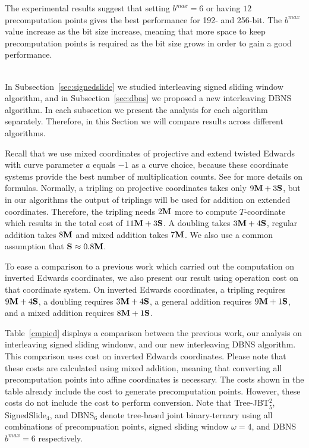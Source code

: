 The experimental results suggest that setting $b^{max} = 6$ or having $12$ precomputation points gives the best performance for 192- and 256-bit.
The $b^{max}$ value increase as the bit size increase, meaning that more space to keep precomputation points is required as the bit size grows
in order to gain a good performance.



 \\

In Subsection~\ref{sec:signedslide} we studied interleaving signed sliding window algorithm,
and in Subsection~\ref{sec:dbns} we proposed a new interleaving DBNS algorithm.
In each subsection we present the analysis for each algorithm separately.
Therefore, in this Section we will compare results across different algorithms.

Recall that we use mixed coordinates of projective and extend twisted Edwards with curve parameter $a$ equals $-1$ as a curve choice,
because these coordinate systems provide the best number of multiplication counts.
See \cite{EFD} for more details on formulas.
Normally, a tripling on projective coordinates takes only $9\text{\bf M} + 3\text{\bf S}$,
but in our algorithms the output of triplings will be used for addition on extended coordinates.
Therefore, the tripling needs $2\text{\bf M}$ more to compute $T$-coordinate which results in the total cost of $11\text{\bf M} + 3\text{\bf S}$.
A doubling takes $3\text{\bf M} + 4\text{\bf S}$, regular addition takes $8\text{\bf M}$ and mixed addition takes $7\text{\bf M}$.
We also use a common assumption that $\text{\bf S} \approx 0.8\text{\bf M}$.

To ease a comparison to a previous work \cite{DKS09} which carried out the computation on inverted Edwards coordinates,
we also present our result using operation cost on that coordinate system.
On inverted Edwards coordinates, a tripling requires $9\text{\bf M} + 4\text{\bf S}$, a doubling requires $3\text{\bf M} + 4\text{\bf S}$, a general addition requires $9\text{\bf M} + 1\text{\bf S}$,
and a mixed addition requires $8\text{\bf M} + 1\text{\bf S}$.

Table~\ref{cmpied} displays a comparison between the previous work\cite{DKS09},
our analysis on interleaving signed sliding windonw,
and our new interleaving DBNS algorithm.
This comparison uses cost on inverted Edwards coordinates.
Please note that these costs are calculated using mixed addition, meaning that converting all precomputation points into affine coordinates is necessary.
The costs shown in the table already include the cost to generate precomputation points.
However, these costs do not include the cost to perform conversion.
Note that Tree-JBT$_5^2$, SignedSlide$_4$, and DBNS$_6$ denote tree-based joint binary-ternary using all combinations of precompuation points,
signed sliding window $\omega = 4$, and DBNS $b^{max} = 6$ respectively.

